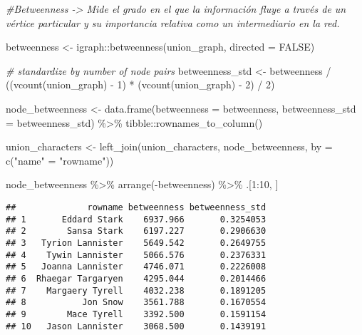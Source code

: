 \documentclass[
]{book}
\newenvironment{Shaded}{\begin{snugshade}}{\end{snugshade}}
\newcommand{\AttributeTok}[1]{\textcolor[rgb]{0.77,0.63,0.00}{#1}}
\newcommand{\CommentTok}[1]{\textcolor[rgb]{0.56,0.35,0.01}{\textit{#1}}}
\newcommand{\ConstantTok}[1]{\textcolor[rgb]{0.00,0.00,0.00}{#1}}
\newcommand{\DecValTok}[1]{\textcolor[rgb]{0.00,0.00,0.81}{#1}}
\newcommand{\FunctionTok}[1]{\textcolor[rgb]{0.00,0.00,0.00}{#1}}
\newcommand{\NormalTok}[1]{#1}
\newcommand{\OtherTok}[1]{\textcolor[rgb]{0.56,0.35,0.01}{#1}}
\newcommand{\SpecialCharTok}[1]{\textcolor[rgb]{0.00,0.00,0.00}{#1}}
\newcommand{\StringTok}[1]{\textcolor[rgb]{0.31,0.60,0.02}{#1}}
\begin{document}
\begin{Shaded}
\begin{Highlighting}[]
\CommentTok{\#Betweenness {-}\textgreater{} Mide el grado en el que la información fluye a través de un vértice particular y su importancia relativa como un intermediario en la red.}

\NormalTok{betweenness }\OtherTok{\textless{}{-}}\NormalTok{ igraph}\SpecialCharTok{::}\FunctionTok{betweenness}\NormalTok{(union\_graph, }\AttributeTok{directed =} \ConstantTok{FALSE}\NormalTok{)}

\CommentTok{\# standardize by number of node pairs}
\NormalTok{betweenness\_std }\OtherTok{\textless{}{-}}\NormalTok{ betweenness }\SpecialCharTok{/}\NormalTok{ ((}\FunctionTok{vcount}\NormalTok{(union\_graph) }\SpecialCharTok{{-}} \DecValTok{1}\NormalTok{) }\SpecialCharTok{*}\NormalTok{ (}\FunctionTok{vcount}\NormalTok{(union\_graph) }\SpecialCharTok{{-}} \DecValTok{2}\NormalTok{) }\SpecialCharTok{/} \DecValTok{2}\NormalTok{)}

\NormalTok{node\_betweenness }\OtherTok{\textless{}{-}} \FunctionTok{data.frame}\NormalTok{(}\AttributeTok{betweenness =}\NormalTok{ betweenness,}
                               \AttributeTok{betweenness\_std =}\NormalTok{ betweenness\_std) }\SpecialCharTok{\%\textgreater{}\%}
\NormalTok{  tibble}\SpecialCharTok{::}\FunctionTok{rownames\_to\_column}\NormalTok{() }

\NormalTok{union\_characters }\OtherTok{\textless{}{-}} \FunctionTok{left\_join}\NormalTok{(union\_characters, node\_betweenness, }\AttributeTok{by =} \FunctionTok{c}\NormalTok{(}\StringTok{"name"} \OtherTok{=} \StringTok{"rowname"}\NormalTok{))}

\NormalTok{node\_betweenness }\SpecialCharTok{\%\textgreater{}\%}
  \FunctionTok{arrange}\NormalTok{(}\SpecialCharTok{{-}}\NormalTok{betweenness) }\SpecialCharTok{\%\textgreater{}\%}
\NormalTok{  .[}\DecValTok{1}\SpecialCharTok{:}\DecValTok{10}\NormalTok{, ]}
\end{Highlighting}
\end{Shaded}

\begin{verbatim}
##              rowname betweenness betweenness_std
## 1       Eddard Stark    6937.966       0.3254053
## 2        Sansa Stark    6197.227       0.2906630
## 3   Tyrion Lannister    5649.542       0.2649755
## 4    Tywin Lannister    5066.576       0.2376331
## 5   Joanna Lannister    4746.071       0.2226008
## 6  Rhaegar Targaryen    4295.044       0.2014466
## 7    Margaery Tyrell    4032.238       0.1891205
## 8           Jon Snow    3561.788       0.1670554
## 9        Mace Tyrell    3392.500       0.1591154
## 10   Jason Lannister    3068.500       0.1439191
\end{verbatim}
\end{document}
